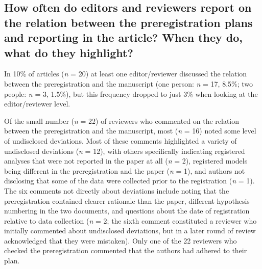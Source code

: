 \documentclass[authordate, empirical]{jote-new-article}
\begin{document}
	\subsection{\textbf{How often do editors and reviewers report on the relation between the preregistration plans and reporting in the article? When they do, what do they highlight?}}



	In 10\% of articles (\emph{n} = 20) at least one editor/reviewer discussed the relation between the preregistration and the manuscript (one person: \emph{n} = 17, 8.5\%; two people: \emph{n} = 3, 1.5\%), but this frequency dropped to just 3\% when looking at the editor/reviewer level.



	Of the small number (\emph{n} = 22) of reviewers who commented on the relation between the preregistration and the manuscript, most (\emph{n} = 16) noted some level of undisclosed deviations. Most of these comments highlighted a variety of undisclosed deviations (\emph{n} = 12), with others specifically indicating registered analyses that were not reported in the paper at all (\emph{n} = 2), registered models being different in the preregistration and the paper (\emph{n} = 1), and authors not disclosing that some of the data were collected prior to the registration (\emph{n} = 1). The six comments not directly about deviations include noting that the preregistration contained clearer rationale than the paper, different hypothesis numbering in the two documents, and questions about the date of registration relative to data collection (\emph{n} = 2; the sixth comment constituted a reviewer who initially commented about undisclosed deviations, but in a later round of review acknowledged that they were mistaken). Only one of the 22 reviewers who checked the preregistration commented that the authors had adhered to their plan.
\end{document}

